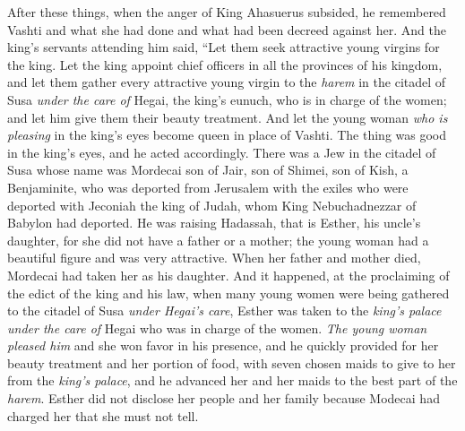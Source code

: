 \begin{biblechapter} %
 After these things, when the anger of King Ahasuerus subsided, he remembered Vashti and what she had done and what had been decreed against her.
\verse And the king’s servants attending him said, “Let them seek attractive young virgins for the king.
\verse Let the king appoint chief officers in all the provinces of his kingdom, and let them gather every attractive young virgin to the \textit{harem} in the citadel of Susa \textit{under the care of} Hegai, the king’s eunuch, who is in charge of the women; and let him give them their beauty treatment.
\verse And let the young woman \textit{who is pleasing} in the king’s eyes become queen in place of Vashti. The thing was good in the king’s eyes, and he acted accordingly.
\verse There was a Jew in the citadel of Susa whose name was Mordecai son of Jair, son of Shimei, son of Kish, a Benjaminite,
\verse who was deported from Jerusalem with the exiles who were deported with Jeconiah the king of Judah, whom King Nebuchadnezzar of Babylon had deported.
\verse He was raising Hadassah, that is Esther, his uncle’s daughter, for she did not have a father or a mother; the young woman had a beautiful figure and was very attractive. When her father and mother died, Mordecai had taken her as his daughter.
\verse And it happened, at the proclaiming of the edict of the king and his law, when many young women were being gathered to the citadel of Susa \textit{under Hegai’s care}, Esther was taken to the \textit{king’s palace} \textit{under the care of} Hegai who was in charge of the women.
\verse \textit{The young woman pleased him} and she won favor in his presence, and he quickly provided for her beauty treatment and her portion of food, with seven chosen maids to give to her from the \textit{king’s palace}, and he advanced her and her maids to the best part of the \textit{harem}.
\verse Esther did not disclose her people and her family because Modecai had charged her that she must not tell.

\end{biblechapter}
